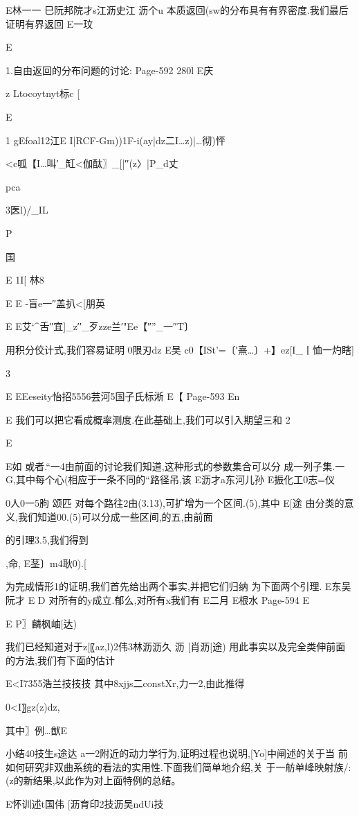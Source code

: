 {{{E林一一
巳阮邦院才s江沥史江
沥个u
本质返回(sw}的分布具有有界密度.我们最后证明有界返回{}
E一玟

E

1.自由返回的分布问题的讨论:
Page-592
280l
E庆

z
Ltocoytnyt标c
[

E

1
gEfoal12江E
I|RCF-Gm))1F-i(ay|dz二I…z)|…彻)怦

<c呱【I…叫′_缸<伽酞〗_[|′′(z〉|P_d丈

pca

3医l)/_IL

P

国

E
1I[
林8

E
E
-盲e一″盖扒<[朋英

E
E艾`^舌″宜]_z′′_歹zze兰′"Ee【″”_一″T〕

用积分佼计式,我们容易证明
0限刃dz
E吴
c0【ISt'=〔′熹…〕+】ez[I_丨恤一灼瞎]

3

E
EEeseity怡招5556芸河5国子氏标淅
E【
Page-593
En

E
我们可以把它看成概率测度.在此基础上,我们可以引入期望三和
2

E

E如
或者.“一4由前面的讨论我们知道,这种形式的参数集合可以分
成一列子集.一G,其中每个心(相应于一条不同的“路径吊,该
E沥才a东河儿孙
E振化工0志=仪

0人0一5朐
颂匹
对每个路往2由(3.13),可扩增为一个区间.(5),其中
E[途
由分类的意义,我们知道00.(5)可以分成一些区间,的五,由前面

的引理3.5,我们得到

,命,
E茎〕m4耿0).[

为完成情形1的证明,我们首先给出两个事实,并把它们归纳
为下面两个引理.
E东吴阮才
E
D
对所有的y成立.郁么,对所有x我们有
E二月
E根水
Page-594
E

E
P〗麟枫岫[达)

我们已经知道对于z[〖az,l)2伟3林沥沥久
沥
[肖沥[途)
用此事实以及完全类伸前面的方法,我们有下面的估计

E<I7355浩兰技技技
其中8xjjs二constXr,力一2,由此推得

0<I〗gz(z)dz,

其中〗例…猷E

小结40技生s途达
a一2附近的动力学行为,证明过程也说明,[Yo]中闸述的关于当
前如何研究非双曲系统的看法的实用性.下面我们简单地介绍,关
于一舫单峰映射族/:(z的新结果,以此作为对上面特例的总结。

E怀训述t国伟
[沥育印2技沥吴ndUi技

}}
